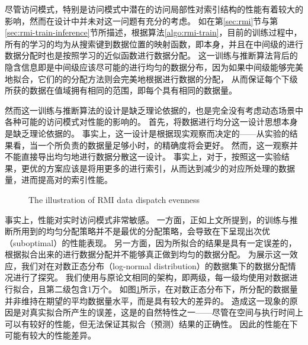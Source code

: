 尽管访问模式，特别是访问模式中潜在的访问局部性对索引结构的性能有着较大的影响，然而{\li}在设计中并未对这一问题有充分的考虑。
如在第\ref{sec:rmi}节与第\ref{sec:rmi-train-inference}节所描述，根据算法\ref{algo:rmi-train}，目前{\rmi}的训练过程中，
所有的{\model}学习的均为从搜索键到数据位置的映射函数，即{\cdf}本身，并且在中间级的{\model}进行数据分配时也是按照学习的{\cdf}近似函数进行数据分配。
这一训练与推断算法背后的隐含信息即是中间级{\model}应该尽可能的进行均匀的数据分布，因为如果中间级{\model}能够完美地拟合{\cdf}，它们的的分配方法则会完美地根据{\cdf}进行数据的分配，
从而保证每个下级{\model}所获的数据在{\cdf}值域拥有相同的范围，即每个{\model}具有相同的数据量。

然而这一{\rmi}训练与推断算法的设计是缺乏理论依据的，也是完全没有考虑动态场景中各种可能的访问模式对{\li}性能的影响的。
首先，将数据进行均分这一设计思想本身是缺乏理论依据的。
事实上，这一设计是根据现实观察而决定的{------}从实验的结果看，当一个{\model}所负责的数据量足够小时，{\model}的精确度将会更好。
然而，这一观察并不能直接导出均匀地进行数据分散这一设计。
事实上，对于{\skewacc}，按照这一实验结果，更优的方案应该是将{\hotkey}用更多的{\model}进行索引，从而达到减少{\hotkey}的对应{\model}所处理的数据量，进而提高对{\hotkey}的索引性能。

\begin{figure}[!htp]
  \centering
    {The illustration of RMI data dispatch evenness}
  \label{fig:rmi-dispatch}
\end{figure}

事实上，{\li}性能对实时访问模式非常敏感。
一方面，正如上文所提到，{\rmi}的训练与推断所用到的均匀分配策略并不是最优的分配策略，会导致在{\skewacc}下呈现出次优（suboptimal）的性能表现。
另一方面，因为{\rmi}所拟合的{\cdf}结果是具有一定误差的，根据拟合出来的{\cdf}进行数据分配并不能够真正做到均匀的数据分配。
为展示这一效应，我们对{\rmi}在对数正态分布（log-normal distribution）的数据集下的数据分配情况进行了探究。
我们使用与原论文相同的{\rmi}架构，即两级{\rmi}，每一级均使用{\lr}对数据进行拟合，且第二级包含1万个{\model}。
如图\ref{fig:rmi-dispatch}所示，在对数正态分布下，{\model}所分配的数据量并非维持在期望的平均数据量水平，而是具有较大的差异的。
造成这一现象的原因是{\model}对真实{\cdf}拟合所产生的误差，这是{\model}的自然特性之一{------}尽管{\model}在空间与执行时间上可以有较好的性能，但{\model}无法保证其拟合（预测）结果的正确性。
因此{\rmi}的性能在{\skewacc}下可能有较大的性能差异。

